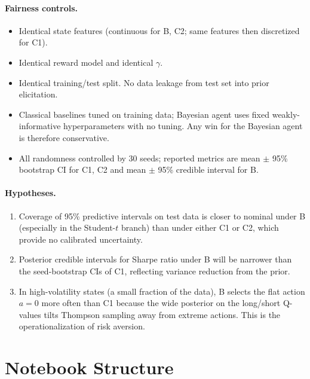 \documentclass[11pt]{article}
\begin{document}
\paragraph{Fairness controls.}
\begin{itemize}[leftmargin=*]
\item Identical state features (continuous for B, C2; same features then discretized for C1).
\item Identical reward model and identical $\gamma$.
\item Identical training/test split. No data leakage from test set into prior elicitation.
\item Classical baselines tuned on training data; Bayesian agent uses fixed weakly-informative hyperparameters with no tuning. Any win for the Bayesian agent is therefore conservative.
\item All randomness controlled by 30 seeds; reported metrics are mean $\pm$ 95\% bootstrap CI for C1, C2 and mean $\pm$ 95\% credible interval for B.
\end{itemize}

\paragraph{Hypotheses.}
\begin{enumerate}[leftmargin=*]
\item Coverage of 95\% predictive intervals on test data is closer to nominal under B (especially in the Student-$t$ branch) than under either C1 or C2, which provide no calibrated uncertainty.
\item Posterior credible intervals for Sharpe ratio under B will be narrower than the seed-bootstrap CIs of C1, reflecting variance reduction from the prior.
\item In high-volatility states (a small fraction of the data), B selects the flat action $a=0$ more often than C1 because the wide posterior on the long/short Q-values tilts Thompson sampling away from extreme actions. This is the operationalization of risk aversion.
\end{enumerate}

\section{Notebook Structure}
\end{document}
